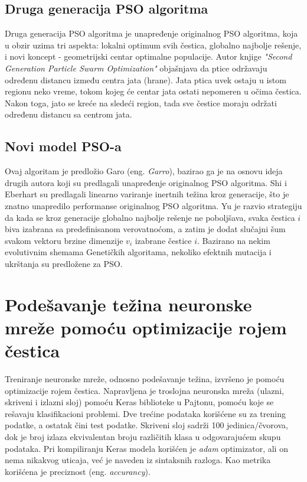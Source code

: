 \documentclass[a4paper]{article}
\begin{document}
{%


\subsection{Druga generacija PSO algoritma}
\label{subsec:sgpso}

Druga generacija PSO algoritma je unapređenje originalnog PSO algoritma, koja u obzir uzima tri aspekta: lokalni optimum svih čestica, 
globalno najbolje rešenje, i novi koncept - geometrijski centar optimalne populacije. Autor knjige \textit{"{}Second Generation Particle Swarm Optimization"} 
objašnjava da ptice održavaju  određenu distancu između centra jata (hrane). Jata ptica uvek ostaju u istom regionu neko vreme, 
tokom kojeg će centar jata ostati nepomeren u očima čestica. Nakon toga, jato se kreće na sledeći region, tada sve čestice moraju 
održati određenu distancu sa centrom jata.

\subsection{Novi model PSO-a}
\label{subsec:nmpso}

Ovaj algoritam je predložio Garo (eng. \textit{Garro}), bazirao ga je na osnovu ideja drugih autora koji su predlagali unapređenje originalnog 
PSO algoritma. Shi i Eberhart su predlagali linearno variranje inertnih težina kroz generacije, što je znatno unapredilo performanse originalnog PSO algoritma.
Yu je razvio strategiju da kada se kroz generacije globalno najbolje rešenje ne poboljšava, svaka čestica \textit{$i$} biva izabrana sa 
predefinisanom verovatnoćom, a zatim je dodat slučajni šum svakom vektoru brzine dimenzije $v_i$ izabrane čestice \textit{$i$}. 
Bazirano na nekim evolutivnim shemama Genetičkih algoritama, nekoliko efektnih mutacija i ukrštanja su predložene za PSO.

\section{Podešavanje težina neuronske mreže pomoću optimizacije rojem čestica}
\label{sec:podesavanjetezina}

Treniranje neuronske mreže, odnosno podešavanje težina, izvršeno je pomoću optimizacije rojem čestica. 
Napravljena je troslojna neuronska mreža (ulazni, skriveni i izlazni sloj) pomoću Keras biblioteke u Pajtonu, pomoću koje se rešavaju klasifikacioni problemi. 
Dve trećine podataka korišćene su za trening podatke, a ostatak čini test podatke. Skriveni sloj sadrži 100 jedinica/čvorova, dok je broj izlaza 
ekvivalentan broju različitih klasa u odgovarajućem skupu podataka. Pri kompiliranju Keras modela korišćen je \textit{adam} optimizator,
ali on nema nikakvog uticaja, već je naveden iz sintaksnih razloga. Kao metrika korišćena je preciznost (eng. \emph{accurancy}). 

}
\end{document}

